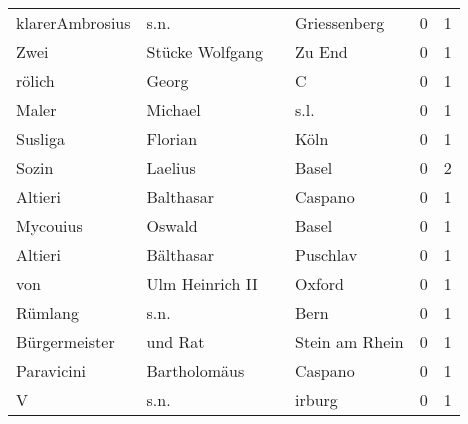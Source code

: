 \begin{tabular}{llllrr}
          klarerAmbrosius &                               s.n. &             &                                Griessenberg &          0 &         1 \\
                     Zwei &                    Stücke Wolfgang &             &                                      Zu End &          0 &         1 \\
                   rölich &                              Georg &             &                                           C &          0 &         1 \\
                    Maler &                            Michael &             &                                        s.l. &          0 &         1 \\
                  Susliga &                            Florian &             &                                        Köln &          0 &         1 \\
                    Sozin &                            Laelius &             &                                       Basel &          0 &         2 \\
                  Altieri &                          Balthasar &             &                                     Caspano &          0 &         1 \\
                 Mycouius &                             Oswald &             &                                       Basel &          0 &         1 \\
                  Altieri &                          Bälthasar &             &                                    Puschlav &          0 &         1 \\
                      von &                    Ulm Heinrich II &             &                                      Oxford &          0 &         1 \\
                  Rümlang &                               s.n. &             &                                        Bern &          0 &         1 \\
            Bürgermeister &                            und Rat &             &                              Stein am Rhein &          0 &         1 \\
               Paravicini &                       Bartholomäus &             &                                     Caspano &          0 &         1 \\
                        V &                               s.n. &             &                                      irburg &          0 &         1 \\

\end{tabular}
